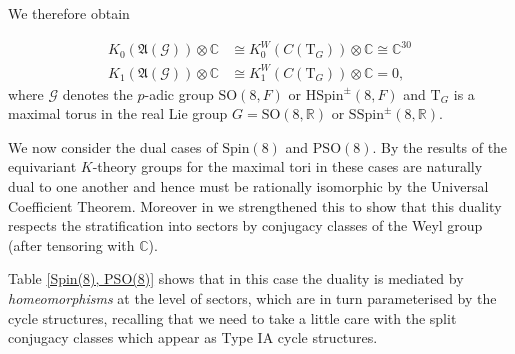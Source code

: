 \documentclass[11pt,a4paper]{article}
\def\SSpin{\mathrm{SSpin}}
\def\HSpin{\mathrm{HSpin}}
\def\Spin{\mathrm{Spin}}
\def\SO{\mathrm{SO}}
\def\PSO{\mathrm{PSO}}
\def\SSpin{\mathrm{SSpin}}
\def\fA{\mathfrak{A}}
\def\R{\mathbb{R}}
\def\fA{\mathfrak{A}}
\newcommand{\C}{\mathbb{C}}
\def\bT{\mathrm{T}}
\def\G{\mathcal{G}}
\begin{document}
We therefore obtain 

\begin{align*}
K_0(\fA(\G))\otimes \mathbb C &\cong K_0^W(C(\bT_G))\otimes \mathbb C\cong\mathbb C^{30}\\
K_1(\fA(\G))\otimes \mathbb C &\cong K_1^W(C(\bT_G))\otimes \mathbb C= 0,
\end{align*}
where $\G$ denotes the $p$-adic group $\SO(8,F)$ or $\HSpin^\pm(8,F)$ and $\bT_G$ is a maximal torus in the real Lie group $G=\SO(8,\R)$ or $\SSpin^\pm(8,\R)$.

\medskip








\bigskip

We now consider the dual cases of $\Spin(8)$ and $\PSO(8)$. By the results of \cite{NPWKdual} the equivariant $K$-theory groups for the maximal tori in these cases are naturally dual to one another and hence must be rationally isomorphic by the Universal Coefficient Theorem. Moreover in \cite{NPWAn} we strengthened this to show that this duality respects the stratification into sectors by conjugacy classes of the Weyl group (after tensoring with $\C$). 


Table \ref{Spin(8), PSO(8)} shows that in this case the duality is mediated by \emph{homeomorphisms} at the level of sectors, which are in turn parameterised by the cycle structures, recalling that we need to take a little care with the split conjugacy classes which appear as Type IA cycle structures.

\bigskip
\end{document}

